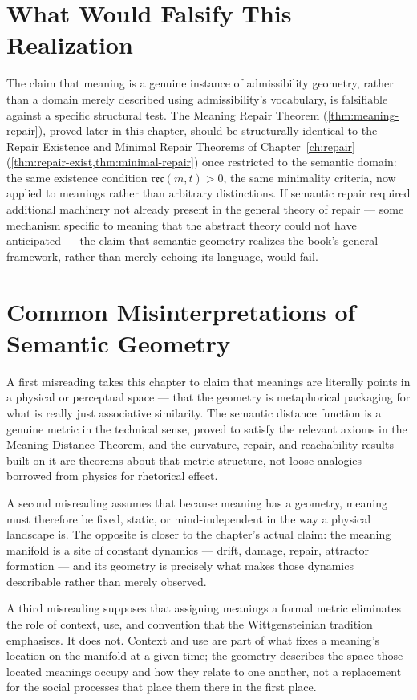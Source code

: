 \documentclass[12pt,twoside,openright]{book}
\newcommand{\reco}{\mathfrak{rec}}
\begin{document}
\section{What Would Falsify This Realization}
\label{sec:ch20-falsifiability}

The claim that meaning is a genuine instance of admissibility
geometry, rather than a domain merely described using
admissibility's vocabulary, is falsifiable against a specific
structural test. The Meaning Repair Theorem
(\cref{thm:meaning-repair}), proved later in this chapter,
should be structurally identical to the Repair Existence and
Minimal Repair Theorems of Chapter~\ref{ch:repair}
(\cref{thm:repair-exist,thm:minimal-repair}) once restricted
to the semantic domain: the same existence condition
$\reco(m,t)>0$, the same minimality criteria, now applied to
meanings rather than arbitrary distinctions. If semantic
repair required additional machinery not already present in
the general theory of repair --- some mechanism specific to
meaning that the abstract theory could not have anticipated
--- the claim that semantic geometry realizes the book's
general framework, rather than merely echoing its language,
would fail.

\section{Common Misinterpretations of Semantic Geometry}
\label{sec:ch20-misinterpretations}

A first misreading takes this chapter to claim that meanings
are literally points in a physical or perceptual space ---
that the geometry is metaphorical packaging for what is
really just associative similarity. The semantic distance
function is a genuine metric in the technical sense, proved
to satisfy the relevant axioms in the Meaning Distance
Theorem, and the curvature, repair, and reachability results
built on it are theorems about that metric structure, not
loose analogies borrowed from physics for rhetorical effect.

A second misreading assumes that because meaning has a
geometry, meaning must therefore be fixed, static, or
mind-independent in the way a physical landscape is. The
opposite is closer to the chapter's actual claim: the meaning
manifold is a site of constant dynamics --- drift, damage,
repair, attractor formation --- and its geometry is precisely
what makes those dynamics describable rather than merely
observed.

A third misreading supposes that assigning meanings a formal
metric eliminates the role of context, use, and convention
that the Wittgensteinian tradition emphasises. It does not.
Context and use are part of what fixes a meaning's location
on the manifold at a given time; the geometry describes the
space those located meanings occupy and how they relate to
one another, not a replacement for the social processes that
place them there in the first place.
\end{document}
